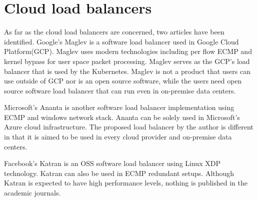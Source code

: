 \section{Cloud load balancers}

As far as the cloud load balancers are concerned, two articles have been identified.
Google's Maglev \cite{eisenbud2016maglev} is a software load balancer used in Google Cloud Platform(GCP).
Maglev uses modern technologies including per flow ECMP and kernel bypass for user space packet processing.
Maglev serves as the GCP's load balancer that is used by the Kubernetes.
Maglev is not a product that users can use outside of GCP nor is an open source software, while the users need open source software load balancer that can run even in on-premise data centers.

Microsoft's Ananta \cite{patel2013ananta} is another software load balancer implementation using ECMP and windows network stack.
Ananta can be solely used in Microsoft's Azure cloud infrastructure\cite{patel2013ananta}.
The proposed load balancer by the author is different in that it is aimed to be used in every cloud provider and on-premise data centers.

Facebook's Katran \cite{2018katran} is an OSS software load balancer using Linux XDP technology.
Katran can also be used in ECMP redundant setups.
Although Katran is expected to have high performance levels, nothing is published in the academic journals.



